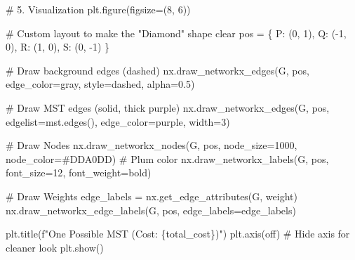 \documentclass[
  letterpaper,
  DIV=11,
  numbers=noendperiod]{scrreprt}
\newenvironment{Shaded}{\begin{snugshade}}{\end{snugshade}}
\newcommand{\CommentTok}[1]{\textcolor[rgb]{0.37,0.37,0.37}{#1}}
\newcommand{\DecValTok}[1]{\textcolor[rgb]{0.68,0.00,0.00}{#1}}
\newcommand{\FloatTok}[1]{\textcolor[rgb]{0.68,0.00,0.00}{#1}}
\newcommand{\NormalTok}[1]{\textcolor[rgb]{0.00,0.23,0.31}{#1}}
\newcommand{\OperatorTok}[1]{\textcolor[rgb]{0.37,0.37,0.37}{#1}}
\newcommand{\SpecialCharTok}[1]{\textcolor[rgb]{0.37,0.37,0.37}{#1}}
\newcommand{\SpecialStringTok}[1]{\textcolor[rgb]{0.13,0.47,0.30}{#1}}
\newcommand{\StringTok}[1]{\textcolor[rgb]{0.13,0.47,0.30}{#1}}
\begin{document}
\begin{Shaded}
\begin{Highlighting}[]
\CommentTok{\# 5. Visualization}
\NormalTok{plt.figure(figsize}\OperatorTok{=}\NormalTok{(}\DecValTok{8}\NormalTok{, }\DecValTok{6}\NormalTok{))}

\CommentTok{\# Custom layout to make the "Diamond" shape clear}
\NormalTok{pos }\OperatorTok{=}\NormalTok{ \{}
    \StringTok{\textquotesingle{}P\textquotesingle{}}\NormalTok{: (}\DecValTok{0}\NormalTok{, }\DecValTok{1}\NormalTok{), }
    \StringTok{\textquotesingle{}Q\textquotesingle{}}\NormalTok{: (}\OperatorTok{{-}}\DecValTok{1}\NormalTok{, }\DecValTok{0}\NormalTok{), }
    \StringTok{\textquotesingle{}R\textquotesingle{}}\NormalTok{: (}\DecValTok{1}\NormalTok{, }\DecValTok{0}\NormalTok{), }
    \StringTok{\textquotesingle{}S\textquotesingle{}}\NormalTok{: (}\DecValTok{0}\NormalTok{, }\OperatorTok{{-}}\DecValTok{1}\NormalTok{)}
\NormalTok{\}}

\CommentTok{\# Draw background edges (dashed)}
\NormalTok{nx.draw\_networkx\_edges(G, pos, edge\_color}\OperatorTok{=}\StringTok{\textquotesingle{}gray\textquotesingle{}}\NormalTok{, style}\OperatorTok{=}\StringTok{\textquotesingle{}dashed\textquotesingle{}}\NormalTok{, alpha}\OperatorTok{=}\FloatTok{0.5}\NormalTok{)}

\CommentTok{\# Draw MST edges (solid, thick purple)}
\NormalTok{nx.draw\_networkx\_edges(G, pos, edgelist}\OperatorTok{=}\NormalTok{mst.edges(), edge\_color}\OperatorTok{=}\StringTok{\textquotesingle{}purple\textquotesingle{}}\NormalTok{, width}\OperatorTok{=}\DecValTok{3}\NormalTok{)}

\CommentTok{\# Draw Nodes}
\NormalTok{nx.draw\_networkx\_nodes(G, pos, node\_size}\OperatorTok{=}\DecValTok{1000}\NormalTok{, node\_color}\OperatorTok{=}\StringTok{\textquotesingle{}\#DDA0DD\textquotesingle{}}\NormalTok{) }\CommentTok{\# Plum color}
\NormalTok{nx.draw\_networkx\_labels(G, pos, font\_size}\OperatorTok{=}\DecValTok{12}\NormalTok{, font\_weight}\OperatorTok{=}\StringTok{\textquotesingle{}bold\textquotesingle{}}\NormalTok{)}

\CommentTok{\# Draw Weights}
\NormalTok{edge\_labels }\OperatorTok{=}\NormalTok{ nx.get\_edge\_attributes(G, }\StringTok{\textquotesingle{}weight\textquotesingle{}}\NormalTok{)}
\NormalTok{nx.draw\_networkx\_edge\_labels(G, pos, edge\_labels}\OperatorTok{=}\NormalTok{edge\_labels)}

\NormalTok{plt.title(}\SpecialStringTok{f"One Possible MST (Cost: }\SpecialCharTok{\{}\NormalTok{total\_cost}\SpecialCharTok{\}}\SpecialStringTok{)"}\NormalTok{)}
\NormalTok{plt.axis(}\StringTok{\textquotesingle{}off\textquotesingle{}}\NormalTok{) }\CommentTok{\# Hide axis for cleaner look}
\NormalTok{plt.show()}
\end{Highlighting}
\end{Shaded}
\end{document}
